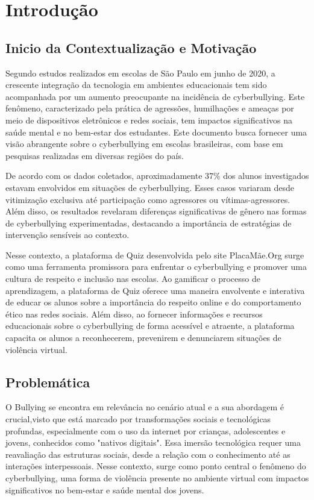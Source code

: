 \chapter{Introdução}


\section{Inicio da Contextualização e Motivação}

Segundo estudos realizados em escolas de São Paulo em junho de 2020, a crescente integração da tecnologia em ambientes educacionais tem sido acompanhada por um aumento preocupante na incidência de cyberbullying. Este fenômeno, caracterizado pela prática de agressões, humilhações e ameaças por meio de dispositivos eletrônicos e redes sociais, tem impactos significativos na saúde mental e no bem-estar dos estudantes. Este documento busca fornecer uma visão abrangente sobre o cyberbullying em escolas brasileiras, com base em pesquisas realizadas em diversas regiões do país.

De acordo com os dados coletados, aproximadamente 37\% dos alunos investigados estavam envolvidos em situações de cyberbullying. Esses casos variaram desde vitimização exclusiva até participação como agressores ou vítimas-agressores. Além disso, os resultados revelaram diferenças significativas de gênero nas formas de cyberbullying experimentadas, destacando a importância de estratégias de intervenção sensíveis ao contexto.

Nesse contexto, a plataforma de Quiz desenvolvida pelo site PlacaMãe.Org surge como uma ferramenta promissora para enfrentar o cyberbullying e promover uma cultura de respeito e inclusão nas escolas.
Ao gamificar o processo de aprendizagem, a plataforma de Quiz oferece uma maneira envolvente e interativa de educar os alunos sobre a importância do respeito online e do comportamento ético nas redes sociais. Além disso, ao fornecer informações e recursos educacionais sobre o cyberbullying de forma acessível e atraente, a plataforma capacita os alunos a reconhecerem, prevenirem e denunciarem situações de violência virtual.

 

\section{Problemática}
O Bullying se encontra em relevância no cenário atual e a sua abordagem é crucial,visto que está marcado por transformações sociais e tecnológicas profundas, especialmente com o uso da internet por crianças, adolescentes e jovens, conhecidos como "nativos digitais". Essa imersão tecnológica requer uma reavaliação das estruturas sociais, desde a relação com o conhecimento até as interações interpessoais. Nesse contexto, surge como ponto central o fenômeno do cyberbullying, uma forma de violência presente no ambiente virtual com impactos significativos no bem-estar e saúde mental dos jovens.

